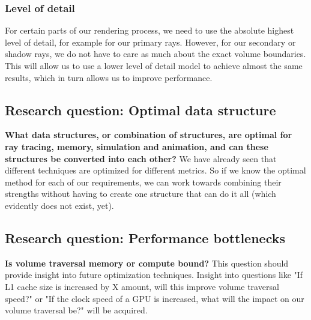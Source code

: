 \subsubsection{Level of detail} \label{requirements:level_of_detail}
For certain parts of our rendering process, we need to use the absolute highest level of detail, for example for our primary rays. However, for our secondary or shadow rays, we do not have to care as much about the exact volume boundaries. This will allow us to use a lower level of detail model to achieve almost the same results, which in turn allows us to improve performance.




\subsection{Research question: Optimal data structure}\label{research_questions:optimal_data_structure}
\noindent\textbf{What data structures, or combination of structures, are optimal for ray tracing, memory, simulation and animation, and can these structures be converted into each other?} We have already seen that different techniques are optimized for different metrics. So if we know the optimal method for each of our requirements, we can work towards combining their strengths without having to create one structure that can do it all (which evidently does not exist, yet).

\subsection{Research question: Performance bottlenecks}\label{research_questions:performance_bottlenecks}
\noindent\textbf{Is volume traversal memory or compute bound?} This question should provide insight into future optimization techniques. Insight into questions like "If L1 cache size is increased by X amount, will this improve volume traversal speed?" or "If the clock speed of a GPU is increased, what will the impact on our volume traversal be?" will be acquired.